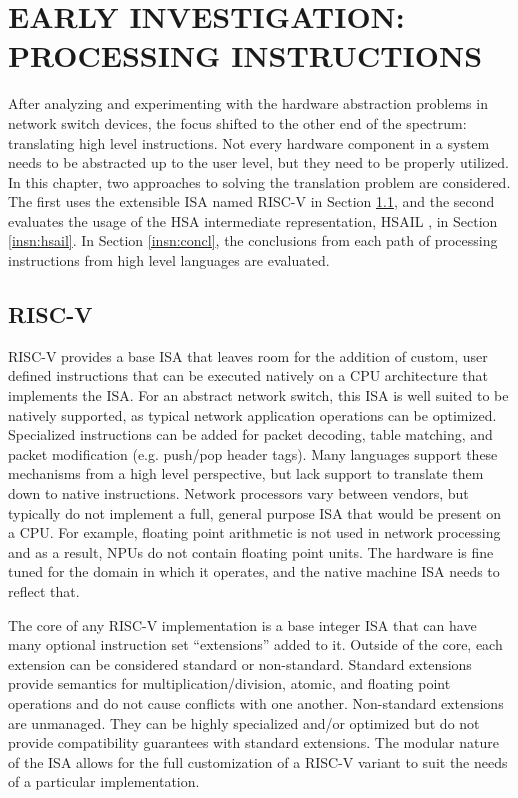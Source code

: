 \chapter{EARLY INVESTIGATION: PROCESSING INSTRUCTIONS}
\label{insn}
After analyzing and experimenting with the hardware abstraction problems in
network switch devices, the focus shifted to the other end of the spectrum:
translating high level instructions. Not every hardware component in a system
needs to be abstracted up to the user level, but they need to be properly
utilized. In this chapter, two approaches to solving the translation problem
are considered. The first uses the extensible ISA named RISC-V in Section
\ref{insn:riscv}, and the second evaluates the usage of the HSA intermediate
representation, HSAIL \cite{hsail}, in Section \ref{insn:hsail}. In Section
\ref{insn:concl}, the conclusions from each path of processing instructions
from high level languages are evaluated.

\section{RISC-V}
\label{insn:riscv}
RISC-V provides a base ISA that leaves room for the addition of custom, user
defined instructions that can be executed natively on a CPU architecture that
implements the ISA. For an abstract network switch, this ISA is well suited to
be natively supported, as typical network application operations can be
optimized. Specialized instructions can be added for packet decoding, table
matching, and packet modification (e.g. push/pop header tags). Many languages
support these mechanisms from a high level perspective, but lack support to
translate them down to native instructions. Network processors vary between
vendors, but typically do not implement a full, general purpose ISA that would
be present on a CPU. For example, floating point arithmetic is not used in
network processing and as a result, NPUs do not contain floating point units.
The hardware is fine tuned for the domain in which it operates, and the
native machine ISA needs to reflect that.

The core of any RISC-V implementation is a base integer ISA that can have many
optional instruction set ``extensions'' added to it. Outside of the core, each
extension can be considered standard or non-standard. Standard extensions
provide semantics for multiplication/division, atomic, and floating point
operations and do not cause conflicts with one another. Non-standard extensions
are unmanaged. They can be highly specialized and/or optimized but do not
provide compatibility guarantees with standard extensions. The modular nature
of the ISA allows for the full customization of a RISC-V variant to suit the
needs of a particular implementation.

